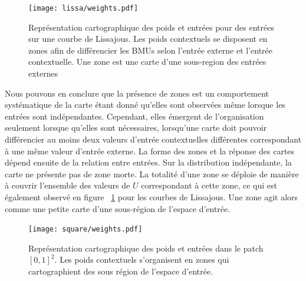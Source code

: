 \documentclass[../main]{subfiles}
\begin{document}
	\begin{figure}[H]
		\centering\texttt{[image: lissa/weights.pdf]}
		\vspace{-0.5cm}
		\caption{Représentation cartographique des poids et entrées pour des entrées sur une courbe de Lissajous. Les poids contextuels se disposent en zones afin de différencier les BMUs selon l'entrée externe et l'entrée contextuelle. Une zone est une carte d'une sous-region des entrées externes \label{fig:lissa}}
	\end{figure}


Nous pouvons en conclure que la présence de zones est un comportement systématique de la carte étant donné qu'elles sont observées même lorsque les entrées sont indépendantes. 
Cependant, elles émergent de l'organisation seulement lorsque qu'elles sont nécessaires, lorsqu'une carte doit pouvoir différencier au moins deux valeurs d'entrée contextuelles différentes correspondant à une même valeur d'entrée externe.
La forme des zones et la réponse des cartes dépend ensuite de la relation entre entrées.
Sur la distribution indépendante, la carte ne présente pas de zone morte. La totalité d'une zone se déploie de manière à couvrir l'ensemble des valeurs de $U$ correspondant à cette zone, ce qui est également observé en figure ~\ref{fig:lissa} pour les courbes de Lissajous. Une zone agit alors comme une petite carte d'une sous-région de l'espace d'entrée. 

\begin{figure}
	\centering\texttt{[image: square/weights.pdf]}
	\vspace{-0.7cm}
	\caption{Représentation cartographique des poids et entrées dans le patch $[0,1]^2$. Les poids contextuels s'organisent en zones qui cartographient des sous région de l'espace d'entrée. \label{fig:ind}}
\end{figure}
\end{document}
